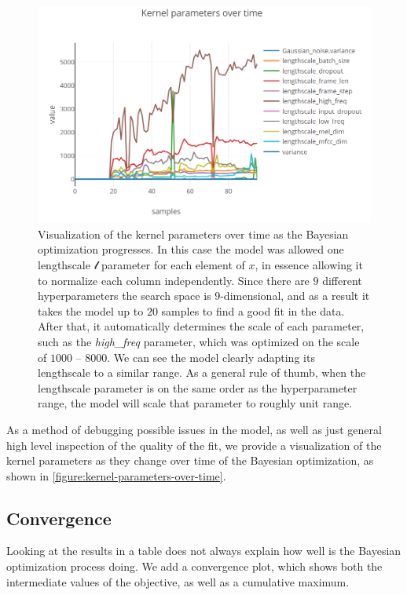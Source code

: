 \begin{figure}
	\begin{center}
		\includegraphics[width=1.0\textwidth]{images/kernel-params-over-time.png}
		\caption{Visualization of the kernel parameters over time as the Bayesian optimization progresses. In this case the model was allowed one lengthscale $\mathcal{l}$ parameter for each element of $x$, in essence allowing it to normalize each column independently. Since there are $9$ different hyperparameters the search space is $9$-dimensional, and as a result it takes the model up to $20$ samples to find a good fit in the data. After that, it automatically determines the scale of each parameter, such as the \emph{high\_freq} parameter, which was optimized on the scale of $1000$ -- $8000$. We can see the model clearly adapting its lengthscale to a similar range. As a general rule of thumb, when the lengthscale parameter is on the same order as the hyperparameter range, the model will scale that parameter to roughly unit range.}
	\end{center}
\end{figure}
\label{figure:kernel-parameters-over-time}

As a method of debugging possible issues in the model, as well as just general high level inspection of the quality of the fit, we provide a visualization of the kernel parameters as they change over time of the Bayesian optimization, as shown in \autoref{figure:kernel-parameters-over-time}.


\subsection{Convergence}

Looking at the results in a table does not always explain how well is the Bayesian optimization process doing. We add a convergence plot, which shows both the intermediate values of the objective, as well as a cumulative maximum. 

